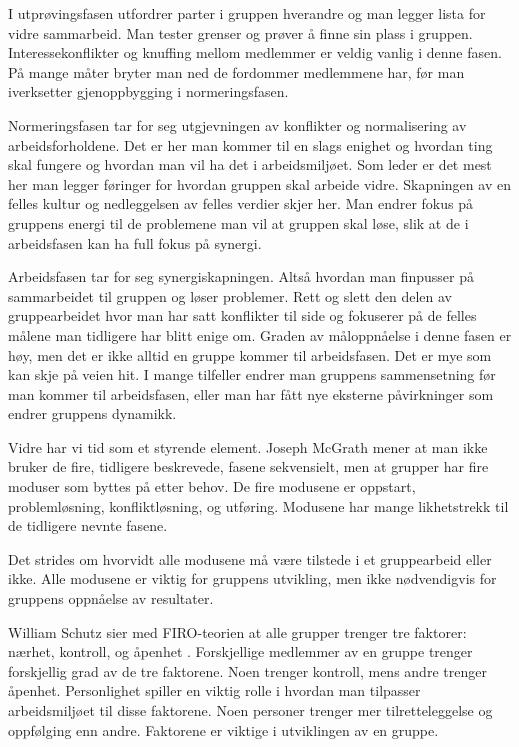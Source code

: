 \documentclass[12pt, a4paper]{article}
\begin{document}
I utprøvingsfasen utfordrer parter i gruppen hverandre og man legger lista for
vidre sammarbeid. Man tester grenser og prøver å finne sin plass i gruppen.
Interessekonflikter og knuffing mellom medlemmer er veldig vanlig i denne
fasen. På mange måter bryter man ned de fordommer medlemmene har, før man
iverksetter gjenoppbygging i normeringsfasen. 

Normeringsfasen tar for seg utgjevningen av konflikter og normalisering av
arbeidsforholdene. Det er her man kommer til en slags enighet og hvordan ting
skal fungere og hvordan man vil ha det i arbeidsmiljøet. Som leder er det mest
her man legger føringer for hvordan gruppen skal arbeide vidre. Skapningen av
en felles kultur og nedleggelsen av felles verdier skjer her. Man endrer fokus
på gruppens energi til de problemene man vil at gruppen skal løse, slik at de i
arbeidsfasen kan ha full fokus på synergi. 
\cite[]{teamet}

Arbeidsfasen tar for seg synergiskapningen. Altså hvordan man finpusser på
sammarbeidet til gruppen og løser problemer. Rett og slett den delen av
gruppearbeidet hvor man har satt konflikter til side og fokuserer på de felles
målene man tidligere har blitt enige om. Graden av måloppnåelse i denne fasen
er høy, men det er ikke alltid en gruppe kommer til arbeidsfasen. Det er mye
som kan skje på veien hit. I mange tilfeller endrer man gruppens sammensetning
før man kommer til arbeidsfasen, eller man har fått nye eksterne påvirkninger
som endrer gruppens dynamikk.  

Vidre har vi tid som et styrende element. Joseph McGrath mener at man ikke
bruker de fire, tidligere beskrevede, fasene sekvensielt, men at grupper har
fire moduser som byttes på etter behov. De fire modusene er oppstart,
problemløsning, konfliktløsning, og utføring. Modusene har mange likhetstrekk
til de tidligere nevnte fasene. 

Det strides om hvorvidt alle modusene må være tilstede i et gruppearbeid eller
ikke. Alle modusene er viktig for gruppens utvikling, men ikke nødvendigvis for
gruppens oppnåelse av resultater.  

William Schutz sier med FIRO-teorien at alle grupper trenger tre faktorer:
nærhet, kontroll, og åpenhet \cite[]{teamet}. Forskjellige medlemmer av en
gruppe trenger forskjellig grad av de tre faktorene. Noen trenger kontroll,
mens andre trenger åpenhet. Personlighet spiller en viktig rolle i hvordan man
tilpasser arbeidsmiljøet til disse faktorene. Noen personer trenger mer
tilretteleggelse og oppfølging enn andre. Faktorene er viktige i utviklingen av
en gruppe.
\end{document}
